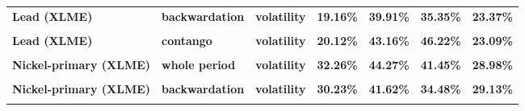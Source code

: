 \documentclass[
  authoryear,
  preprint,
  3p]{elsarticle}
\begin{document}
\begin{longtable}[t]{>{}l>{}l>{}l>{}r>{}r>{}r>{}r}
\textbf{Lead (XLME)} & \textbf{backwardation} & \textbf{volatility} & \textcolor[HTML]{4285f4}{\textbf{19.16\%}} & \textcolor[HTML]{4285f4}{\textbf{39.91\%}} & \textcolor[HTML]{4285f4}{\textbf{35.35\%}} & \textcolor[HTML]{4285f4}{\textbf{23.37\%}}\\
\addlinespace
\textbf{\cellcolor{gray!10}{Lead (XLME)}} & \textbf{\cellcolor{gray!10}{contango}} & \textbf{\cellcolor{gray!10}{mean}} & \textcolor[HTML]{4285f4}{\textbf{\cellcolor{gray!10}{-0.09\%}}} & \textcolor[HTML]{4285f4}{\textbf{\cellcolor{gray!10}{*46.48\%}}} & \textcolor[HTML]{4285f4}{\textbf{\cellcolor{gray!10}{12.65\%}}} & \textcolor[HTML]{4285f4}{\textbf{\cellcolor{gray!10}{-13.41\%}}}\\
\textbf{Lead (XLME)} & \textbf{contango} & \textbf{volatility} & \textcolor[HTML]{4285f4}{\textbf{20.12\%}} & \textcolor[HTML]{4285f4}{\textbf{43.16\%}} & \textcolor[HTML]{4285f4}{\textbf{46.22\%}} & \textcolor[HTML]{4285f4}{\textbf{23.09\%}}\\
\textbf{\cellcolor{gray!10}{Nickel-primary (XLME)}} & \textbf{\cellcolor{gray!10}{whole period}} & \textbf{\cellcolor{gray!10}{mean}} & \textcolor[HTML]{4285f4}{\textbf{\cellcolor{gray!10}{19.31\%}}} & \textcolor[HTML]{4285f4}{\textbf{\cellcolor{gray!10}{12.5\%}}} & \textcolor[HTML]{4285f4}{\textbf{\cellcolor{gray!10}{3.52\%}}} & \textcolor[HTML]{4285f4}{\textbf{\cellcolor{gray!10}{0.31\%}}}\\
\textbf{Nickel-primary (XLME)} & \textbf{whole period} & \textbf{volatility} & \textcolor[HTML]{4285f4}{\textbf{32.26\%}} & \textcolor[HTML]{4285f4}{\textbf{44.27\%}} & \textcolor[HTML]{4285f4}{\textbf{41.45\%}} & \textcolor[HTML]{4285f4}{\textbf{28.98\%}}\\
\textbf{\cellcolor{gray!10}{Nickel-primary (XLME)}} & \textbf{\cellcolor{gray!10}{backwardation}} & \textbf{\cellcolor{gray!10}{mean}} & \textcolor[HTML]{4285f4}{\textbf{\cellcolor{gray!10}{23.25\%}}} & \textcolor[HTML]{4285f4}{\textbf{\cellcolor{gray!10}{-39.24\%}}} & \textcolor[HTML]{4285f4}{\textbf{\cellcolor{gray!10}{16.3\%}}} & \textcolor[HTML]{4285f4}{\textbf{\cellcolor{gray!10}{**35.09\%}}}\\
\addlinespace
\textbf{Nickel-primary (XLME)} & \textbf{backwardation} & \textbf{volatility} & \textcolor[HTML]{4285f4}{\textbf{30.23\%}} & \textcolor[HTML]{4285f4}{\textbf{41.62\%}} & \textcolor[HTML]{4285f4}{\textbf{34.48\%}} & \textcolor[HTML]{4285f4}{\textbf{29.13\%}}\\
\textbf{\cellcolor{gray!10}{Nickel-primary (XLME)}} & \textbf{\cellcolor{gray!10}{contango}} & \textbf{\cellcolor{gray!10}{mean}} & \textcolor[HTML]{4285f4}{\textbf{\cellcolor{gray!10}{15.46\%}}} & \textcolor[HTML]{4285f4}{\textbf{\cellcolor{gray!10}{**63.47\%}}} & \textcolor[HTML]{4285f4}{\textbf{\cellcolor{gray!10}{-7.67\%}}} & \textcolor[HTML]{4285f4}{\textbf{\cellcolor{gray!10}{**-34.64\%}}}\\

\end{longtable}
\end{document}
